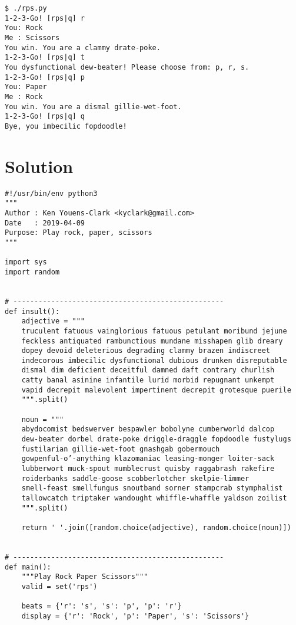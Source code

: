 \documentclass[]{article}
\begin{document}
\begin{verbatim}
$ ./rps.py
1-2-3-Go! [rps|q] r
You: Rock
Me : Scissors
You win. You are a clammy drate-poke.
1-2-3-Go! [rps|q] t
You dysfunctional dew-beater! Please choose from: p, r, s.
1-2-3-Go! [rps|q] p
You: Paper
Me : Rock
You win. You are a dismal gillie-wet-foot.
1-2-3-Go! [rps|q] q
Bye, you imbecilic fopdoodle!
\end{verbatim}

\pagebreak

\hypertarget{solution-10}{%
\section{Solution}\label{solution-10}}

\begin{verbatim}
#!/usr/bin/env python3
"""
Author : Ken Youens-Clark <kyclark@gmail.com>
Date   : 2019-04-09
Purpose: Play rock, paper, scissors
"""

import sys
import random


# --------------------------------------------------
def insult():
    adjective = """
    truculent fatuous vainglorious fatuous petulant moribund jejune
    feckless antiquated rambunctious mundane misshapen glib dreary
    dopey devoid deleterious degrading clammy brazen indiscreet
    indecorous imbecilic dysfunctional dubious drunken disreputable
    dismal dim deficient deceitful damned daft contrary churlish
    catty banal asinine infantile lurid morbid repugnant unkempt
    vapid decrepit malevolent impertinent decrepit grotesque puerile
    """.split()

    noun = """
    abydocomist bedswerver bespawler bobolyne cumberworld dalcop
    dew-beater dorbel drate-poke driggle-draggle fopdoodle fustylugs
    fustilarian gillie-wet-foot gnashgab gobermouch
    gowpenful-o’-anything klazomaniac leasing-monger loiter-sack
    lubberwort muck-spout mumblecrust quisby raggabrash rakefire
    roiderbanks saddle-goose scobberlotcher skelpie-limmer
    smell-feast smellfungus snoutband sorner stampcrab stymphalist
    tallowcatch triptaker wandought whiffle-whaffle yaldson zoilist
    """.split()

    return ' '.join([random.choice(adjective), random.choice(noun)])


# --------------------------------------------------
def main():
    """Play Rock Paper Scissors"""
    valid = set('rps')

    beats = {'r': 's', 's': 'p', 'p': 'r'}
    display = {'r': 'Rock', 'p': 'Paper', 's': 'Scissors'}


\end{verbatim}
\end{document}

